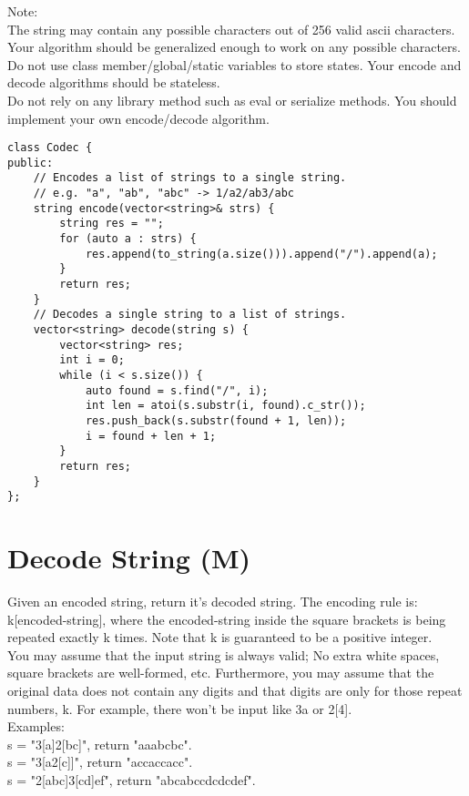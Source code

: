 Note:\\
    The string may contain any possible characters out of 256 valid ascii characters. Your algorithm should be generalized enough to work on any possible characters.\\
    Do not use class member/global/static variables to store states. Your encode and decode algorithms should be stateless.\\
    Do not rely on any library method such as eval or serialize methods. You should implement your own encode/decode algorithm.\\

\begin{lstlisting}
class Codec {
public:
    // Encodes a list of strings to a single string.
    // e.g. "a", "ab", "abc" -> 1/a2/ab3/abc
    string encode(vector<string>& strs) {
        string res = "";
        for (auto a : strs) {
            res.append(to_string(a.size())).append("/").append(a);
        }
        return res;
    }
    // Decodes a single string to a list of strings.
    vector<string> decode(string s) {
        vector<string> res;
        int i = 0;
        while (i < s.size()) {
            auto found = s.find("/", i);
            int len = atoi(s.substr(i, found).c_str());
            res.push_back(s.substr(found + 1, len));
            i = found + len + 1;
        }
        return res;
    }
};
\end{lstlisting}


\section{Decode String (M)}
Given an encoded string, return it's decoded string. The encoding rule is: k[encoded-string], where the encoded-string inside the square brackets is being repeated exactly k times. Note that k is guaranteed to be a positive integer.\\

You may assume that the input string is always valid; No extra white spaces, square brackets are well-formed, etc. Furthermore, you may assume that the original data does not contain any digits and that digits are only for those repeat numbers, k. For example, there won't be input like 3a or 2[4].\\

Examples:\\
s = "3[a]2[bc]", return "aaabcbc".\\
s = "3[a2[c]]", return "accaccacc".\\
s = "2[abc]3[cd]ef", return "abcabccdcdcdef".\\

